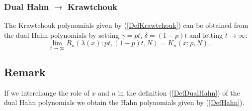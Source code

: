 \documentclass[envcountchap,graybox]{svmono}
\newcounter{rom}
\begin{document}
\subsubsection*{Dual Hahn $\rightarrow$ Krawtchouk}
The Krawtchouk polynomials given by (\ref{DefKrawtchouk}) can be obtained from the dual
Hahn polynomials by setting $\gamma=pt$, $\delta=(1-p)t$ and letting $t\rightarrow\infty$:
\begin{equation}
\lim_{t\rightarrow\infty}R_n(\lambda(x);pt,(1-p)t,N)=K_n(x;p,N).
\end{equation}

\subsection*{Remark}
If we interchange the role of $x$ and $n$ in the definition (\ref{DefDualHahn})
of the dual Hahn polynomials we obtain the Hahn polynomials given by (\ref{DefHahn}).
\end{document}
